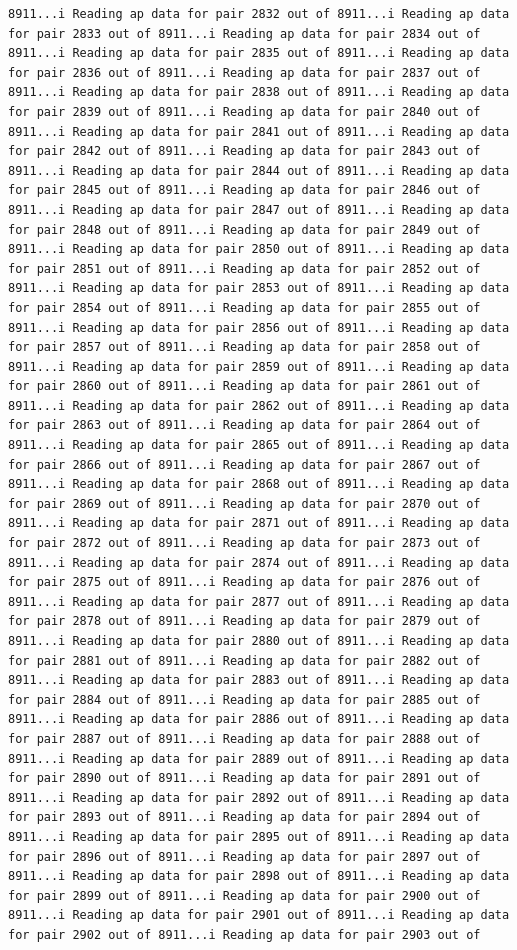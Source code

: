 \documentclass[
]{article}
\begin{document}
\begin{verbatim}
8911...i Reading ap data for pair 2832 out of 8911...i Reading ap data for pair 2833 out of 8911...i Reading ap data for pair 2834 out of 8911...i Reading ap data for pair 2835 out of 8911...i Reading ap data for pair 2836 out of 8911...i Reading ap data for pair 2837 out of 8911...i Reading ap data for pair 2838 out of 8911...i Reading ap data for pair 2839 out of 8911...i Reading ap data for pair 2840 out of 8911...i Reading ap data for pair 2841 out of 8911...i Reading ap data for pair 2842 out of 8911...i Reading ap data for pair 2843 out of 8911...i Reading ap data for pair 2844 out of 8911...i Reading ap data for pair 2845 out of 8911...i Reading ap data for pair 2846 out of 8911...i Reading ap data for pair 2847 out of 8911...i Reading ap data for pair 2848 out of 8911...i Reading ap data for pair 2849 out of 8911...i Reading ap data for pair 2850 out of 8911...i Reading ap data for pair 2851 out of 8911...i Reading ap data for pair 2852 out of 8911...i Reading ap data for pair 2853 out of 8911...i Reading ap data for pair 2854 out of 8911...i Reading ap data for pair 2855 out of 8911...i Reading ap data for pair 2856 out of 8911...i Reading ap data for pair 2857 out of 8911...i Reading ap data for pair 2858 out of 8911...i Reading ap data for pair 2859 out of 8911...i Reading ap data for pair 2860 out of 8911...i Reading ap data for pair 2861 out of 8911...i Reading ap data for pair 2862 out of 8911...i Reading ap data for pair 2863 out of 8911...i Reading ap data for pair 2864 out of 8911...i Reading ap data for pair 2865 out of 8911...i Reading ap data for pair 2866 out of 8911...i Reading ap data for pair 2867 out of 8911...i Reading ap data for pair 2868 out of 8911...i Reading ap data for pair 2869 out of 8911...i Reading ap data for pair 2870 out of 8911...i Reading ap data for pair 2871 out of 8911...i Reading ap data for pair 2872 out of 8911...i Reading ap data for pair 2873 out of 8911...i Reading ap data for pair 2874 out of 8911...i Reading ap data for pair 2875 out of 8911...i Reading ap data for pair 2876 out of 8911...i Reading ap data for pair 2877 out of 8911...i Reading ap data for pair 2878 out of 8911...i Reading ap data for pair 2879 out of 8911...i Reading ap data for pair 2880 out of 8911...i Reading ap data for pair 2881 out of 8911...i Reading ap data for pair 2882 out of 8911...i Reading ap data for pair 2883 out of 8911...i Reading ap data for pair 2884 out of 8911...i Reading ap data for pair 2885 out of 8911...i Reading ap data for pair 2886 out of 8911...i Reading ap data for pair 2887 out of 8911...i Reading ap data for pair 2888 out of 8911...i Reading ap data for pair 2889 out of 8911...i Reading ap data for pair 2890 out of 8911...i Reading ap data for pair 2891 out of 8911...i Reading ap data for pair 2892 out of 8911...i Reading ap data for pair 2893 out of 8911...i Reading ap data for pair 2894 out of 8911...i Reading ap data for pair 2895 out of 8911...i Reading ap data for pair 2896 out of 8911...i Reading ap data for pair 2897 out of 8911...i Reading ap data for pair 2898 out of 8911...i Reading ap data for pair 2899 out of 8911...i Reading ap data for pair 2900 out of 8911...i Reading ap data for pair 2901 out of 8911...i Reading ap data for pair 2902 out of 8911...i Reading ap data for pair 2903 out of 
\end{verbatim}
\end{document}
